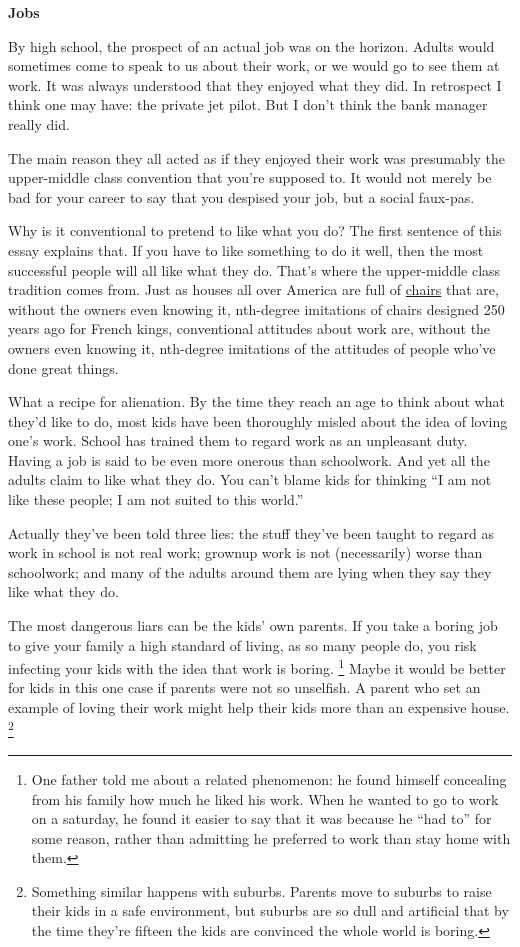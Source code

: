 \documentclass[12pt]{book}
\begin{document}
\textbf{Jobs}

By high school, the prospect of an actual job was on the horizon. Adults
would sometimes come to speak to us about their work, or we would go to
see them at work. It was always understood that they enjoyed what they
did. In retrospect I think one may have: the private jet pilot. But I
don't think the bank manager really did.

The main reason they all acted as if they enjoyed their work was
presumably the upper-middle class convention that you're supposed to. It
would not merely be bad for your career to say that you despised your
job, but a social faux-pas.

Why is it conventional to pretend to like what you do? The first
sentence of this essay explains that. If you have to like something to
do it well, then the most successful people will all like what they do.
That's where the upper-middle class tradition comes from. Just as houses
all over America are full of
\href{http://images.google.com/images?q=louis\%20xv\%20chair}{chairs}
that are, without the owners even knowing it, nth-degree imitations of
chairs designed 250 years ago for French kings, conventional attitudes
about work are, without the owners even knowing it, nth-degree
imitations of the attitudes of people who've done great things.

What a recipe for alienation. By the time they reach an age to think
about what they'd like to do, most kids have been thoroughly misled
about the idea of loving one's work. School has trained them to regard
work as an unpleasant duty. Having a job is said to be even more onerous
than schoolwork. And yet all the adults claim to like what they do. You
can't blame kids for thinking ``I am not like these people; I am not
suited to this world.''

Actually they've been told three lies: the stuff they've been taught to
regard as work in school is not real work; grownup work is not
(necessarily) worse than schoolwork; and many of the adults around them
are lying when they say they like what they do.

The most dangerous liars can be the kids' own parents. If you take a
boring job to give your family a high standard of living, as so many
people do, you risk infecting your kids with the idea that work is
boring. \footnote{One father told me about a related phenomenon: he found himself
concealing from his family how much he liked his work. When he wanted to
go to work on a saturday, he found it easier to say that it was because
he ``had to'' for some reason, rather than admitting he preferred to
work than stay home with them.} Maybe it would be better for kids in
this one case if parents were not so unselfish. A parent who set an
example of loving their work might help their kids more than an
expensive house. \footnote{Something similar happens with suburbs. Parents move to suburbs
to raise their kids in a safe environment, but suburbs are so dull and
artificial that by the time they're fifteen the kids are convinced the
whole world is boring.}
\end{document}
